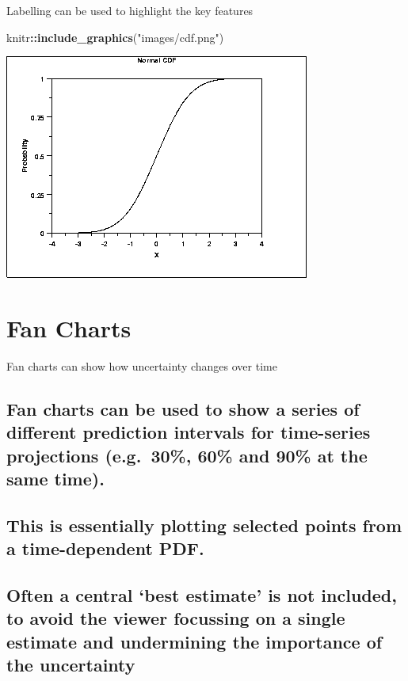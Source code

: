 \documentclass[]{book}
\newenvironment{Shaded}{\begin{snugshade}}{\end{snugshade}}
\newcommand{\KeywordTok}[1]{\textcolor[rgb]{0.13,0.29,0.53}{\textbf{#1}}}
\newcommand{\StringTok}[1]{\textcolor[rgb]{0.31,0.60,0.02}{#1}}
\newcommand{\OperatorTok}[1]{\textcolor[rgb]{0.81,0.36,0.00}{\textbf{#1}}}
\newcommand{\NormalTok}[1]{#1}
\begin{document}
 Labelling can be used to highlight the key features

\begin{Shaded}
\begin{Highlighting}[]
\NormalTok{knitr}\OperatorTok{::}\KeywordTok{include_graphics}\NormalTok{(}\StringTok{"images/cdf.png"}\NormalTok{)}
\end{Highlighting}
\end{Shaded}

\begin{center}\includegraphics{images/cdf} \end{center}

\section{Fan Charts}\label{fan-charts}

 Fan charts can show how uncertainty changes over time

\subsection{Fan charts can be used to show a series of different
prediction intervals for time-series projections (e.g.~30\%, 60\% and
90\% at the same
time).}\label{fan-charts-can-be-used-to-show-a-series-of-different-prediction-intervals-for-time-series-projections-e.g.30-60-and-90-at-the-same-time.}

\subsection{This is essentially plotting selected points from a
time-dependent
PDF.}\label{this-is-essentially-plotting-selected-points-from-a-time-dependent-pdf.}

\subsection{\texorpdfstring{Often a central `best estimate' is not
included, to avoid the viewer focussing on a single estimate and
undermining the importance of the
uncertainty}{Often a central best estimate is not included, to avoid the viewer focussing on a single estimate and undermining the importance of the uncertainty}}\label{often-a-central-best-estimate-is-not-included-to-avoid-the-viewer-focussing-on-a-single-estimate-and-undermining-the-importance-of-the-uncertainty}
\end{document}
